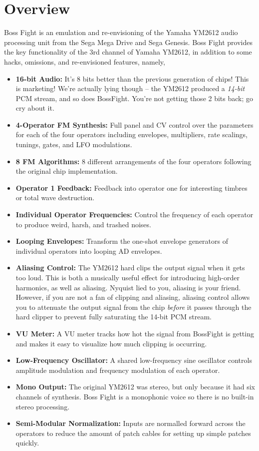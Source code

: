 \documentclass[12pt,letter]{article}
\begin{document}


\section*{Overview}

Boss Fight is an emulation and re-envisioning of the Yamaha YM2612 audio processing unit from the Sega Mega Drive and Sega Genesis. Boss Fight provides the key functionality of the 3rd channel of Yamaha YM2612, in addition to some hacks, omissions, and re-envisioned features, namely,
\begin{itemize}
  \item \textbf{16-bit Audio:} It's 8 bits better than the previous generation of chips! This is marketing! We're actually lying though -- the YM2612 produced a \textit{14-bit} PCM stream, and so does BossFight. You're not getting those 2 bits back; go cry about it.
  \item \textbf{4-Operator FM Synthesis:} Full panel and CV control over the parameters for each of the four operators including envelopes, multipliers, rate scalings, tunings, gates, and LFO modulations.
  \item \textbf{8 FM Algorithms:} 8 different arrangements of the four operators following the original chip implementation.
  \item \textbf{Operator 1 Feedback:} Feedback into operator one for interesting timbres or total wave destruction.
  \item \textbf{Individual Operator Frequencies:} Control the frequency of each operator to produce weird, harsh, and trashed noises.
  \item \textbf{Looping Envelopes:} Transform the one-shot envelope generators of individual operators into looping AD envelopes.
  \item \textbf{Aliasing Control:} The YM2612 hard clips the output signal when it gets too loud. This is both a musically useful effect for introducing high-order harmonics, as well as aliasing. Nyquist lied to you, aliasing is your friend. However, if you are not a fan of clipping and aliasing, aliasing control allows you to attenuate the output signal from the chip \textit{before} it passes through the hard clipper to prevent fully saturating the 14-bit PCM stream.
  \item \textbf{VU Meter:} A VU meter tracks how hot the signal from BossFight is getting and makes it easy to visualize how much clipping is occurring.
  \item \textbf{Low-Frequency Oscillator:} A shared low-frequency sine oscillator controls amplitude modulation and frequency modulation of each operator.
  \item \textbf{Mono Output:} The original YM2612 was stereo, but only because it had six channels of synthesis. Boss Fight is a monophonic voice so there is no built-in stereo processing.
  \item \textbf{Semi-Modular Normalization:} Inputs are normalled forward across the operators to reduce the amount of patch cables for setting up simple patches quickly.
\end{itemize}
\end{document}
